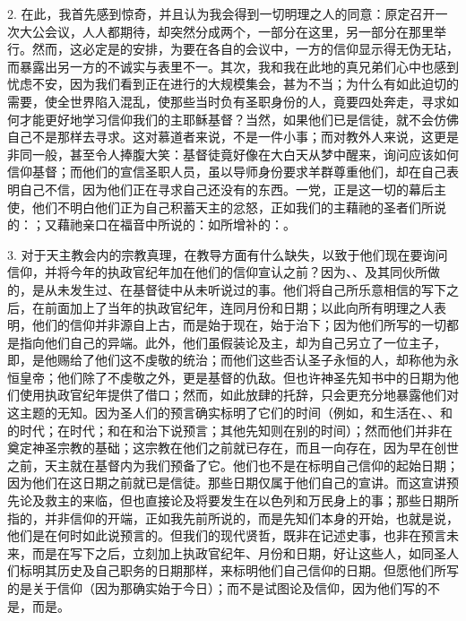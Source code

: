2. 在此，我首先感到惊奇，并且认为我会得到一切明理之人的同意：原定召开一次大公会议，人人都期待，却突然分成两个，一部分在这里，另一部分在那里举行。然而，这必定是的安排，为要在各自的会议中，一方的信仰显示得无伪无玷，而暴露出另一方的不诚实与表里不一。其次，我和我在此地的真兄弟们心中也感到忧虑不安，因为我们看到正在进行的大规模集会，甚为不当；为什么有如此迫切的需要，使全世界陷入混乱，使那些当时负有圣职身份的人，竟要四处奔走，寻求如何才能更好地学习信仰我们的主耶稣基督？当然，如果他们已是信徒，就不会仿佛自己不是那样去寻求。这对慕道者来说，不是一件小事；而对教外人来说，这更是非同一般，甚至令人捧腹大笑：基督徒竟好像在大白天从梦中醒来，询问应该如何信仰基督；而他们的宣信圣职人员，虽以导师身份要求羊群尊重他们，却在自己表明自己不信，因为他们正在寻求自己还没有的东西。一党，正是这一切的幕后主使，他们不明白他们正为自己积蓄天主的忿怒，正如我们的主藉祂的圣者们所说的：；又藉祂亲口在福音中所说的：如所增补的：。\par

3. 对于天主教会内的宗教真理，在教导方面有什么缺失，以致于他们现在要询问信仰，并将今年的执政官纪年加在他们的信仰宣认之前？因为、、及其同伙所做的，是从未发生过、在基督徒中从未听说过的事。他们将自己所乐意相信的写下之后，在前面加上了当年的执政官纪年，连同月份和日期；以此向所有明理之人表明，他们的信仰并非源自上古，而是始于现在，始于治下；因为他们所写的一切都是指向他们自己的异端。此外，他们虽假装论及主，却为自己另立了一位主子，即，是他赐给了他们这不虔敬的统治；而他们这些否认圣子永恒的人，却称他为永恒皇帝；他们除了不虔敬之外，更是基督的仇敌。但也许神圣先知书中的日期为他们使用执政官纪年提供了借口；然而，如此放肆的托辞，只会更充分地暴露他们对这主题的无知。因为圣人们的预言确实标明了它们的时间（例如，和生活在、、和的时代；在时代；和在和治下说预言；其他先知则在别的时间）；然而他们并非在奠定神圣宗教的基础；这宗教在他们之前就已存在，而且一向存在，因为早在创世之前，天主就在基督内为我们预备了它。他们也不是在标明自己信仰的起始日期；因为他们在这日期之前就已是信徒。那些日期仅属于他们自己的宣讲。而这宣讲预先论及救主的来临，但也直接论及将要发生在以色列和万民身上的事；那些日期所指的，并非信仰的开端，正如我先前所说的，而是先知们本身的开始，也就是说，他们是在何时如此说预言的。但我们的现代贤哲，既非在记述史事，也非在预言未来，而是在写下之后，立刻加上执政官纪年、月份和日期，好让这些人，如同圣人们标明其历史及自己职务的日期那样，来标明他们自己信仰的日期。但愿他们所写的是关于信仰（因为那确实始于今日）；而不是试图论及信仰，因为他们写的不是，而是。\par

